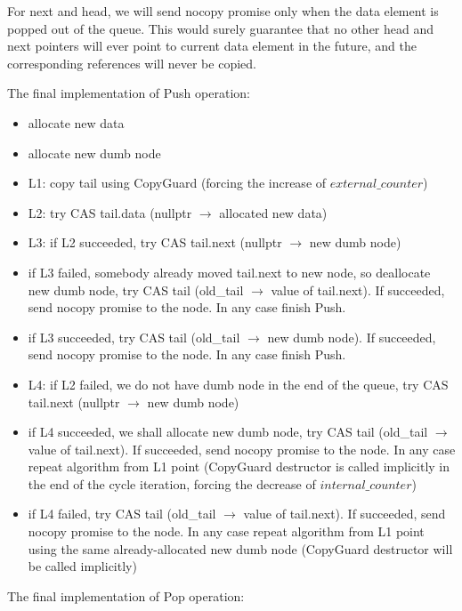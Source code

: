 \documentclass{article}
\begin{document}
For next and head, we will send nocopy promise only when the data element is popped out of the queue. This would surely guarantee that no other head and next pointers will ever point to current data element in the future, and the corresponding references will never be copied.

The final implementation of Push operation:

\begin{itemize}
	\item allocate new data
	\item allocate new dumb node
	\item L1: copy tail using CopyGuard (forcing the increase of $external\_counter$)
	\item L2: try CAS tail.data (nullptr $\rightarrow$ allocated new data)
	\item L3: if L2 succeeded, try CAS tail.next (nullptr $\rightarrow$ new dumb node)
	\item if L3 failed, somebody already moved tail.next to new node, so deallocate new dumb node, try CAS tail (old\_tail $\rightarrow$ value of tail.next). If succeeded, send nocopy promise to the node. In any case finish Push.
	\item if L3 succeeded, try CAS tail (old\_tail $\rightarrow$ new dumb node). If succeeded, send nocopy promise to the node. In any case finish Push.
	\item L4: if L2 failed, we do not have dumb node in the end of the queue, try CAS tail.next (nullptr $\rightarrow$ new dumb node)
	\item if L4 succeeded, we shall allocate new dumb node, try CAS tail (old\_tail $\rightarrow$ value of tail.next). If succeeded, send nocopy promise to the node. In any case repeat algorithm from L1 point (CopyGuard destructor is called implicitly in the end of the cycle iteration, forcing the decrease of $internal\_counter$)
	\item if L4 failed, try CAS tail (old\_tail $\rightarrow$ value of tail.next). If succeeded, send nocopy promise to the node. In any case repeat algorithm from L1 point using the same already-allocated new dumb node (CopyGuard destructor will be called implicitly)
\end{itemize}

The final implementation of Pop operation:
\end{document}
